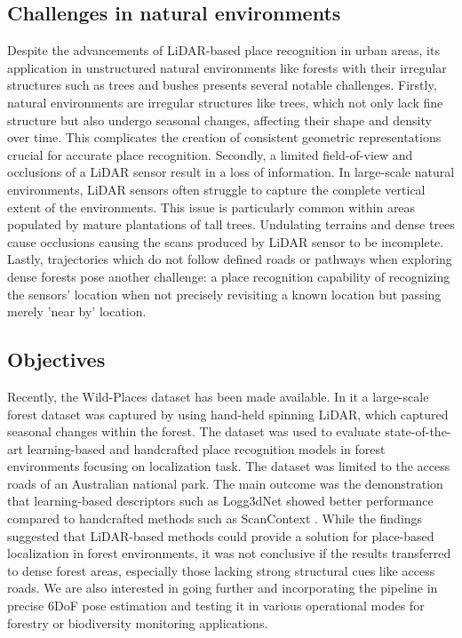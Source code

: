 \subsection*{Challenges in natural environments}
Despite the advancements of LiDAR-based place recognition in urban areas, its application in unstructured natural environments like forests with their irregular structures such as trees and bushes presents several notable challenges. 
Firstly, natural environments are irregular structures like trees, which not only lack fine structure but also undergo seasonal changes, affecting their shape and density over time. This complicates the creation of consistent geometric representations crucial for accurate place recognition.
Secondly, a limited field-of-view and occlusions of a LiDAR sensor result in a loss of information. In large-scale natural environments, LiDAR sensors often struggle to capture the complete vertical extent of the environments. 
This issue is particularly common within areas populated by mature plantations of tall trees. Undulating terrains and dense trees cause occlusions causing the scans produced by LiDAR sensor to be incomplete.
Lastly, trajectories which do not follow defined roads or pathways when exploring dense forests pose another challenge: a place recognition capability of recognizing the sensors' location when not precisely revisiting a known location but passing merely 'near by' location. 


\subsection*{Objectives}
Recently, the Wild-Places dataset \cite{knights2023icra} has been made available. In it a large-scale forest dataset was captured by using hand-held spinning LiDAR, which captured seasonal changes within the forest. The dataset was used to evaluate state-of-the-art learning-based and handcrafted place recognition models in forest environments focusing on localization task. The dataset was limited to the access roads of an Australian national park. The main outcome was the demonstration that learning-based descriptors such as Logg3dNet \cite{vidanapathirana2022icra} showed better performance compared to handcrafted methods such as ScanContext \cite{kim2018iros}. While the findings suggested that LiDAR-based methods could provide a solution for place-based localization in forest environments, it was not conclusive if the results transferred to dense forest areas, especially those lacking strong structural cues like access roads. We are also interested in going further and incorporating the pipeline in precise 6DoF pose estimation and testing it in various operational modes for forestry or biodiversity monitoring applications.


